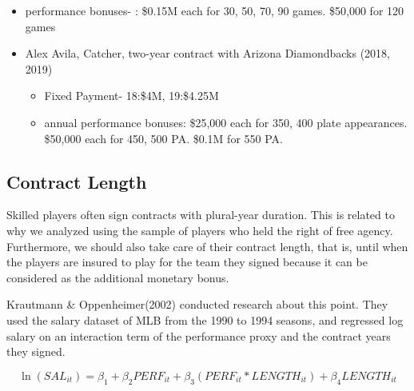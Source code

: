 \documentclass[dvipdfmx, 12pt]{article}
\begin{document}
\begin{table}
\begin{itemize}
\begin{itemize}
      \item performance bonuses- : \$0.15M each for 30, 50, 70, 90 games. \$50,000 for 120 games
    \end{itemize}
  \end{itemize}

\begin{itemize}
  \item Alex Avila, Catcher, two-year contract with Arizona Diamondbacks (2018, 2019)

  \begin{itemize}
    \item Fixed Payment- 18:\$4M, 19:\$4.25M

    \item annual performance bonuses: \$25,000 each for 350, 400 plate appearances. \$50,000 each for 450, 500 PA. \$0.1M for 550 PA.
  \end{itemize}
\end{itemize}
\end{table}

\subsection{Contract Length}

Skilled players often sign contracts with plural-year duration. This is related to why we analyzed using the sample of players who held the right of free agency. Furthermore, we should also take care of their contract length, that is, until when the players are insured to play for the team they signed because it can be considered as the additional monetary bonus.

Krautmann \& Oppenheimer(2002) conducted research about this point. They used the salary dataset of MLB from the 1990 to 1994 seasons, and regressed log salary on an interaction term of the performance proxy and the contract years they signed.

\[
\ln(SAL_{it}) = \beta_1 + \beta_2 PERF_{it} + \beta_3 (PERF_{it} * LENGTH_{it})+ \beta_4 LENGTH_{it}
\]
\end{document}

